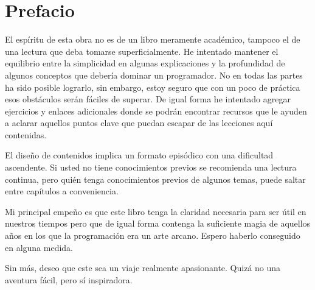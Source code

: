 \thispagestyle{empty}

\chapter{Prefacio}


El espíritu de esta obra no es de un libro meramente académico, tampoco el de una lectura que deba tomarse superficialmente. He intentado mantener el equilibrio entre la simplicidad en algunas explicaciones y la profundidad de algunos conceptos que debería dominar un programador. No en todas las partes ha sido posible lograrlo, sin embargo, estoy seguro que con un poco de práctica esos obstáculos serán fáciles de superar. De igual forma he intentado agregar ejercicios y enlaces adicionales donde se podrán encontrar recursos que le ayuden a aclarar aquellos puntos clave que puedan escapar de las lecciones aquí contenidas.

El diseño de contenidos implica un formato episódico con una dificultad ascendente. Si usted no tiene conocimientos previos se recomienda una lectura continua, pero quién tenga conocimientos previos de algunos temas, puede saltar entre capítulos a conveniencia.

Mi principal empeño es que este libro tenga la claridad necesaria para ser útil en nuestros tiempos pero que de igual forma contenga la suficiente magia de aquellos años en los que la programación era un arte arcano. Espero haberlo conseguido en alguna medida.

Sin más, deseo que este sea un viaje realmente apasionante. Quizá no una aventura fácil, pero sí inspiradora. 



